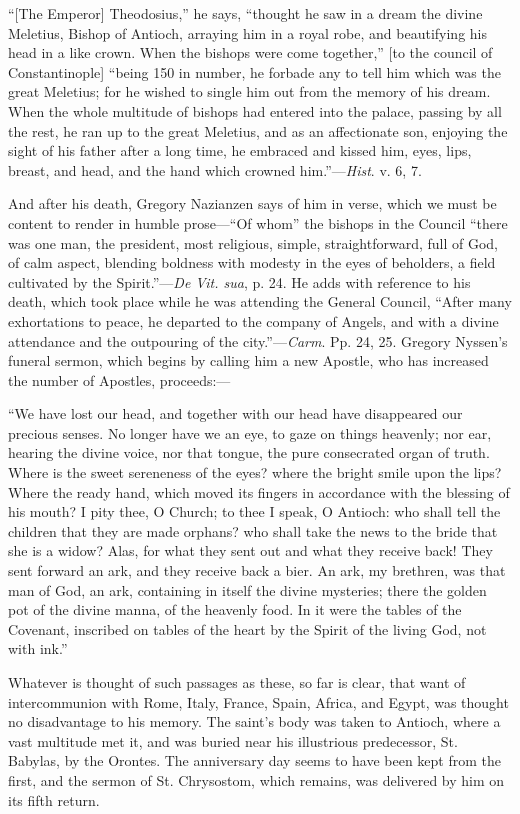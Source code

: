 ``[The Emperor]
Theodosius,'' he says, ``thought he saw in a dream the divine
Meletius, Bishop of Antioch, arraying him in a royal robe, and
beautifying his head in a like crown. When the bishops were come
together,'' [to the council of Constantinople] ``being 150 in
number, he forbade any to tell him which was the great Meletius; for
he wished to single him out from the memory of his dream. When the
whole multitude of bishops had entered into the palace, passing by all
the rest, he ran up to the great Meletius, and as an affectionate son,
enjoying the sight of his father after a long time, he embraced and
kissed him, eyes, lips, breast, and head, and the hand which crowned
him.''—\emph{Hist}. v. 6, 7.

And after his death, Gregory Nazianzen says of
him in verse, which we must be content to render in humble prose—``Of whom'' the bishops in the Council ``there was one
man, the president, most religious, simple, straightforward, full of
God, of calm aspect, blending boldness with modesty in the eyes of
beholders, a field cultivated by the Spirit.''—\emph{De Vit. sua},
p. 24. He adds with reference to his death, which took place while he
was attending the General Council, ``After many exhortations to
peace, he departed to the company of Angels, and with a divine
attendance and the outpouring of the city.''—\emph{Carm}. Pp. 24,
25. Gregory Nyssen's funeral sermon, which begins by calling him a
new Apostle, who has increased the number of Apostles, proceeds:—

``We have lost
our head, and together with our head have disappeared our precious
senses. No longer have we an eye, to gaze on things heavenly; nor ear,
hearing the divine voice, nor that tongue, the pure consecrated organ
of truth. Where is the sweet sereneness of the eyes? where the bright
smile upon the lips? Where the ready hand, which moved its fingers in
accordance with the blessing of his mouth? I pity thee, O Church; to
thee I speak, O Antioch: who shall tell the children that they are
made orphans? who shall take the news to the bride that she is a
widow? Alas, for what they sent out and what they receive back! They
sent forward an ark, and they receive back a bier. An ark, my
brethren, was that man of God, an ark, containing in itself the divine
mysteries; there the golden pot of the divine manna, of the heavenly
food. In it were the tables of the Covenant, inscribed on tables of
the heart by the Spirit of the living God, not with ink.''

Whatever is thought of such passages as these, so
far is clear, that want of intercommunion with Rome, Italy, France,
Spain, Africa, and Egypt, was thought no disadvantage to his memory.
The saint's body was taken to Antioch, where a vast multitude met
it, and was buried near his illustrious predecessor, St. Babylas, by
the Orontes. The anniversary day seems to have been kept from the
first, and the sermon of St. Chrysostom, which remains, was delivered
by him on its fifth return.

